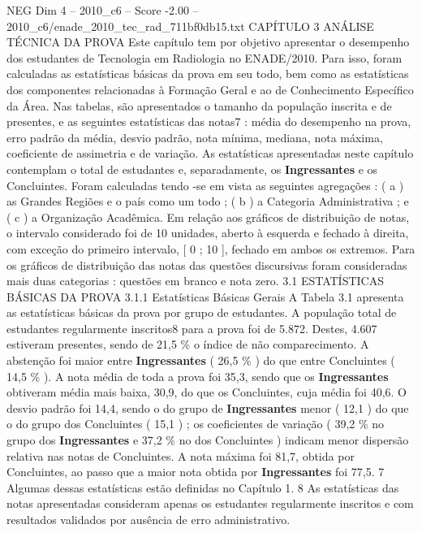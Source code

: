 \begin{textsample}{NEG Dim 4 – 2010\_c6 – Score -2.00 – 2010\_c6/enade\_2010\_tec\_rad\_711bf0db15.txt}  \label{ex:f4_neg_048}
CAPÍTULO 3 ANÁLISE TÉCNICA DA PROVA Este capítulo tem por objetivo apresentar o desempenho dos estudantes de Tecnologia em Radiologia no ENADE/2010.
Para isso, foram calculadas as estatísticas básicas da prova em seu todo, bem como as estatísticas dos componentes relacionadas à Formação Geral e ao de Conhecimento Específico da Área.
Nas tabelas, são apresentados o tamanho da população inscrita e de presentes, e as seguintes estatísticas das notas7 : média do desempenho na prova, erro padrão da média, desvio padrão, nota mínima, mediana, nota máxima, coeficiente de assimetria e de variação.
As estatísticas apresentadas neste capítulo contemplam o total de estudantes e, separadamente, os \textbf{Ingressantes} e os Concluintes.
Foram calculadas tendo -se em vista as seguintes agregações : ( a ) as Grandes Regiões e o país como um todo ; ( b ) a Categoria Administrativa ; e ( c ) a Organização Acadêmica.
Em relação aos gráficos de distribuição de notas, o intervalo considerado foi de 10 unidades, aberto à esquerda e fechado à direita, com exceção do primeiro intervalo, [ 0 ; 10 ], fechado em ambos os extremos.
Para os gráficos de distribuição das notas das questões discursivas foram consideradas mais duas categorias : questões em branco e nota zero. 3.1 ESTATÍSTICAS BÁSICAS DA PROVA 3.1.1 Estatísticas Básicas Gerais A Tabela 3.1 apresenta as estatísticas básicas da prova por grupo de estudantes.
A população total de estudantes regularmente inscritos8 para a prova foi de 5.872.
Destes, 4.607 estiveram presentes, sendo de 21,5 \% o índice de não comparecimento.
A abstenção foi maior entre \textbf{Ingressantes} ( 26,5 \% ) do que entre Concluintes ( 14,5 \% ).
A nota média de toda a prova foi 35,3, sendo que os \textbf{Ingressantes} obtiveram média mais baixa, 30,9, do que os Concluintes, cuja média foi 40,6.
O desvio padrão foi 14,4, sendo o do grupo de \textbf{Ingressantes} menor ( 12,1 ) do que o do grupo dos Concluintes ( 15,1 ) ; os coeficientes de variação ( 39,2 \% no grupo dos \textbf{Ingressantes} e 37,2 \% no dos Concluintes ) indicam menor dispersão relativa nas notas de Concluintes.
A nota máxima foi 81,7, obtida por Concluintes, ao passo que a maior nota obtida por \textbf{Ingressantes} foi 77,5. 7 Algumas dessas estatísticas estão definidas no Capítulo 1. 8 As estatísticas das notas apresentadas consideram apenas os estudantes regularmente inscritos e com resultados validados por ausência de erro administrativo.

\end{textsample}
